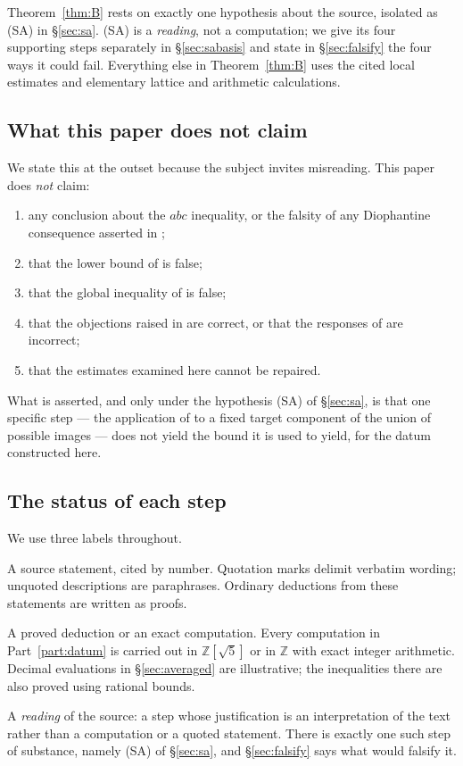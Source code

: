 \documentclass[11pt]{article}
\theoremstyle{plain}
\theoremstyle{definition}
\newcommand{\SA}{\textup{(SA)}}
\begin{document}
Theorem~\ref{thm:B} rests on exactly one hypothesis about the source, isolated as
\SA{} in \S\ref{sec:sa}.  \SA{} is a \emph{reading}, not a computation; we give
its four supporting steps separately in \S\ref{sec:sabasis} and state in
\S\ref{sec:falsify} the four ways it could fail.  Everything else in
Theorem~\ref{thm:B} uses the cited local estimates and elementary lattice
and arithmetic calculations.

\subsection{What this paper does not claim}\label{sec:notclaim}

We state this at the outset because the subject invites misreading.
This paper does \emph{not} claim:
\begin{enumerate}[label=(\roman*)]
\item any conclusion about the $abc$ inequality, or the falsity of any Diophantine consequence
      asserted in \cite{IUT4};
\item that the lower bound of \cite[Corollary 3.12]{IUT3} is false;
\item that the global inequality of \cite[Theorem 1.10]{IUT4} is false;
\item that the objections raised in \cite{SS} are correct, or that the responses
      of \cite{Rpt2018} are incorrect;
\item that the estimates examined here cannot be repaired.
\end{enumerate}
What is asserted, and only under the hypothesis \SA{} of \S\ref{sec:sa}, is that
one specific step --- the application of \cite[Proposition 1.4(iii)]{IUT4} to a
fixed target component of the union of possible images --- does not yield the
bound it is used to yield, for the datum constructed here.

\subsection{The status of each step}

We use three labels throughout.
\begin{description}[leftmargin=2.2em,style=nextline]
\item[{[S]}] A source statement, cited by number.  Quotation marks delimit
  verbatim wording; unquoted descriptions are paraphrases.  Ordinary deductions
  from these statements are written as proofs.
\item[{[P]}] A proved deduction or an exact computation.  Every computation in Part~\ref{part:datum}
  is carried out in $\mathbb{Z}[\sqrt5]$ or in $\mathbb{Z}$ with exact integer
  arithmetic.  Decimal evaluations in \S\ref{sec:averaged} are illustrative;
  the inequalities there are also proved using rational bounds.
\item[{[H]}] A \emph{reading} of the source: a step whose justification is an
  interpretation of the text rather than a computation or a quoted statement.
  There is exactly one such step of substance, namely \SA{} of \S\ref{sec:sa},
  and \S\ref{sec:falsify} says what would falsify it.
\end{description}
\end{document}
